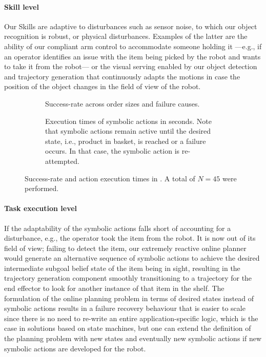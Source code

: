 \paragraph{Skill level} Our Skills are adaptive to disturbances such as sensor noise, to which our object recognition is robust, or physical disturbances. Examples of the latter are the ability of our compliant arm control to accommodate someone holding it ---e.g., if an operator identifies an issue with the item being picked by the robot and wants to take it from the robot--- or the visual serving enabled by our object detection and trajectory generation that continuously adapts the motions in case the position of the object changes in the field of view of the robot.
\begin{figure}[t]
\begin{subfigure}[b]{1\linewidth}
    \centering
    
    \caption{Success-rate across order sizes and failure causes.}
    \label{fig:success_zandam}
  \end{subfigure}
\begin{subfigure}[b]{1\linewidth}
    \centering%
     
    \caption{Execution times of symbolic actions in seconds. Note
    that symbolic actions remain active until the desired state,
    i.e., product in basket, is reached or a failure occurs.
    In that case, the symbolic action is re-attempted.}
    \label{fig:timings_real}
  \end{subfigure}
  \caption{Success-rate and action execution times in
  \realsupermarket. A total of $N=45$ were performed.}
\end{figure}
\paragraph{Task execution level}
If the adaptability of the symbolic actions falls short of
accounting for a disturbance, e.g., the operator took the
item from the robot. It is now out of its field of view;
failing to detect the item, our extremely reactive online
planner would generate an alternative sequence of symbolic actions to achieve the desired intermediate subgoal belief state of the item being in sight, resulting in the trajectory generation component smoothly transitioning to a trajectory for the end effector to look for another instance of that item in the shelf.
The formulation of the online planning problem in terms of
desired states instead of symbolic actions results in a failure
recovery behaviour that is easier to scale since there is no
need to re-write an entire application-specific logic, which
is the case in solutions based on state machines, but one
can extend the definition of the planning problem with new
states and eventually new symbolic actions if new symbolic actions are
developed for the robot.

